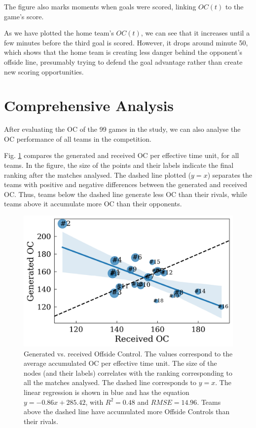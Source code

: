 \documentclass[
  10pt,
  twoside,nohyper]{book}
\begin{document}
The figure also marks moments when goals were scored, linking \(OC(t)\) to the game's score.

As we have plotted the home team's \(OC(t)\), we can see that it increases until a few minutes before the third goal is scored. However, it drops around minute 50, which shows that the home team is creating less danger behind the opponent's offside line, presumably trying to defend the goal advantage rather than create new scoring opportunities.

\section{Comprehensive Analysis}\label{comprehensive-analysis}

After evaluating the OC of the 99 games in the study, we can also analyse the OC performance of all teams in the competition.

Fig. \ref{fig:ranking} compares the generated and received OC per effective time unit, for all teams. In the figure, the size of the points and their labels indicate the final ranking after the matches analysed. The dashed line plotted (\(y=x\)) separates the teams with positive and negative differences between the generated and received OC. Thus, teams below the dashed line generate less OC than their rivals, while teams above it accumulate more OC than their opponents.

\pagebreak

\begin{figure}[H]

{\centering \includegraphics[width=0.7\linewidth,]{imagenes/Mean_rival_OC_vs_team_norm_efftime} 

}

\caption{Generated vs. received Offside Control. The values correspond to the average accumulated OC per effective time unit. The size of the nodes (and their labels) correlates with the ranking corresponding to all the matches analysed. The dashed line corresponds to $y=x$. The linear regression is shown in blue and has the equation $y = -0.86x + 285.42$, with $R^2 = 0.48$ and $RMSE = 14.96$. Teams above the dashed line have accumulated more Offside Controls than their rivals.}\label{fig:ranking}
\end{figure}
\end{document}
